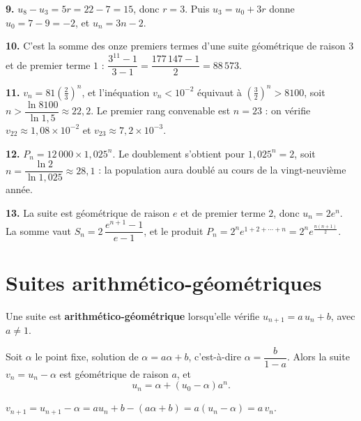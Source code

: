 \begin{corrige}
\textbf{9.} $u_{8}-u_{3} = 5r = 22-7 = 15$, donc $r = 3$. Puis
$u_{3} = u_{0}+3r$ donne $u_{0} = 7-9 = -2$, et $u_{n} = 3n-2$.

\textbf{10.} C'est la somme des onze premiers termes d'une suite géométrique
de raison $3$ et de premier terme $1$ :
$\dfrac{3^{11}-1}{3-1} = \dfrac{177\,147-1}{2} = 88\,573$.

\textbf{11.} $v_{n} = 81\left(\frac23\right)^{n}$, et l'inéquation
$v_{n}<10^{-2}$ équivaut à $\left(\frac32\right)^{n} > 8100$, soit
$n > \dfrac{\ln 8100}{\ln 1{,}5} \approx 22{,}2$. Le premier rang convenable
est $n = 23$ : on vérifie $v_{22} \approx 1{,}08\times10^{-2}$ et
$v_{23} \approx 7{,}2\times10^{-3}$.

\textbf{12.} $P_{n} = 12\,000\times1{,}025^{n}$. Le doublement s'obtient pour
$1{,}025^{n} = 2$, soit $n = \dfrac{\ln2}{\ln 1{,}025} \approx 28{,}1$ : la
population aura doublé au cours de la vingt-neuvième année.

\textbf{13.} La suite est géométrique de raison $e$ et de premier terme $2$,
donc $u_{n} = 2e^{n}$. La somme vaut
$S_{n} = 2\,\dfrac{e^{n+1}-1}{e-1}$, et le produit
$P_{n} = 2^{n}e^{1+2+\cdots+n} = 2^{n}e^{\frac{n(n+1)}{2}}$.
\end{corrige}

\section{Suites arithmético-géométriques}

\begin{definition}
Une suite est \textbf{arithmético-géométrique} lorsqu'elle vérifie
$u_{n+1} = a\,u_{n}+b$, avec $a \neq 1$.
\end{definition}

\begin{propriete}[réduction]
Soit $\alpha$ le point fixe, solution de $\alpha = a\alpha+b$, c'est-à-dire
$\alpha = \dfrac{b}{1-a}$. Alors la suite $v_{n} = u_{n}-\alpha$ est
géométrique de raison $a$, et
\[
  u_{n} = \alpha + \left(u_{0}-\alpha\right)a^{n}.
\]
\end{propriete}

\begin{demonstration}
$v_{n+1} = u_{n+1}-\alpha = au_{n}+b-(a\alpha+b) = a\left(u_{n}-\alpha\right)
= a\,v_{n}$.
\end{demonstration}

